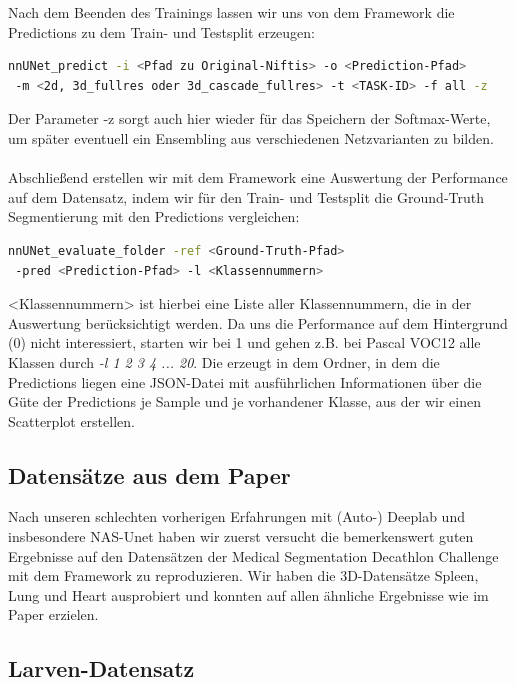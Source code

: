 Nach dem Beenden des Trainings lassen wir uns von dem Framework die Predictions zu dem Train- und Testsplit erzeugen:
\begin{lstlisting}[language=bash]
nnUNet_predict -i <Pfad zu Original-Niftis> -o <Prediction-Pfad>
 -m <2d, 3d_fullres oder 3d_cascade_fullres> -t <TASK-ID> -f all -z
\end{lstlisting}
Der Parameter -z sorgt auch hier wieder für das Speichern der Softmax-Werte, um später eventuell ein Ensembling aus verschiedenen Netzvarianten zu bilden.\\\\
Abschließend erstellen wir mit dem Framework eine Auswertung der Performance auf dem Datensatz, indem wir für den Train- und Testsplit die Ground-Truth Segmentierung mit den Predictions vergleichen:
\begin{lstlisting}[language=bash]
nnUNet_evaluate_folder -ref <Ground-Truth-Pfad>
 -pred <Prediction-Pfad> -l <Klassennummern>
\end{lstlisting}
<Klassennummern> ist hierbei eine Liste aller Klassennummern, die in der Auswertung berücksichtigt werden. Da uns die Performance auf dem Hintergrund (0) nicht interessiert, starten wir bei 1 und gehen z.B. bei Pascal VOC12 \cite{PascalVOCDatensatz} alle Klassen durch \textit{-l 1 2 3 4 ... 20}. Die erzeugt in dem Ordner, in dem die Predictions liegen eine JSON-Datei mit ausführlichen Informationen über die Güte der Predictions je Sample und je vorhandener Klasse, aus der wir einen Scatterplot erstellen.




\subsection{Datensätze aus dem Paper}
Nach unseren schlechten vorherigen Erfahrungen mit (Auto-) Deeplab \cite{deeplabGithub} und insbesondere NAS-Unet \cite{nasunetGithub} haben wir zuerst versucht die bemerkenswert guten Ergebnisse \parencite[Kapitel 4, Table 2]{nnunetPaper} auf den Datensätzen der Medical Segmentation Decathlon Challenge \cite{msdChallenge} mit dem Framework zu reproduzieren. Wir haben die 3D-Datensätze Spleen, Lung und Heart \cite{msdChallenge} ausprobiert und konnten auf allen ähnliche Ergebnisse wie im Paper \cite{nnunetPaper} erzielen.\\

\subsection{Larven-Datensatz}
